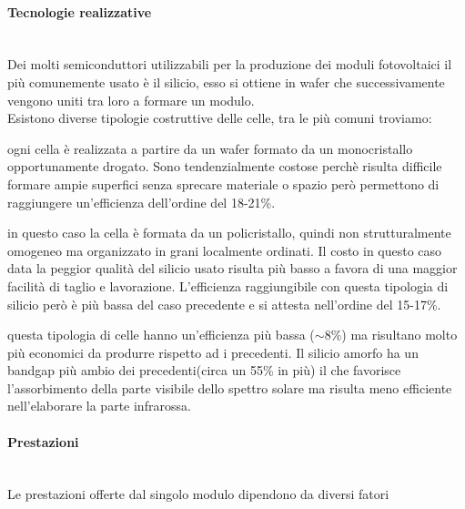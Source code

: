 \paragraph{Tecnologie realizzative}\mbox{}\\
Dei molti semiconduttori utilizzabili per la produzione dei moduli fotovoltaici il più comunemente usato è il silicio, esso si ottiene in wafer che successivamente vengono uniti tra loro a formare un modulo.\\
Esistono diverse tipologie costruttive delle celle, tra le più comuni troviamo:
\begin{description}[labelindent=5mm]
    \item[$\cdot$ Silicio monocristallino:] ogni cella è realizzata a partire da un wafer formato da un monocristallo opportunamente drogato. Sono tendenzialmente costose perchè risulta difficile formare ampie superfici senza sprecare materiale o spazio però permettono di raggiungere un'efficienza dell'ordine del 18-21\%.
    \item[$\cdot$ Silicio policristallino:] in questo caso la cella è formata da un policristallo, quindi non strutturalmente omogeneo ma organizzato in grani localmente ordinati. Il costo in questo caso data la peggior qualità del silicio usato risulta più basso a favora di una maggior facilità di taglio e lavorazione. L'efficienza raggiungibile con questa tipologia di silicio però è più bassa del caso precedente e si attesta nell'ordine del 15-17\%. 
    \item[$\cdot$ Silicio amorfo:] questa tipologia di celle hanno un'efficienza più bassa ($\sim8\%$) ma risultano molto più economici da produrre rispetto ad i precedenti. Il silicio amorfo ha un bandgap più ambio dei precedenti(circa un 55\% in più) il che favorisce l'assorbimento della parte visibile dello spettro solare ma risulta meno efficiente nell'elaborare la parte infrarossa.
\end{description}
\paragraph{Prestazioni}\mbox{}\\
Le prestazioni offerte dal singolo modulo dipendono da diversi fatori 